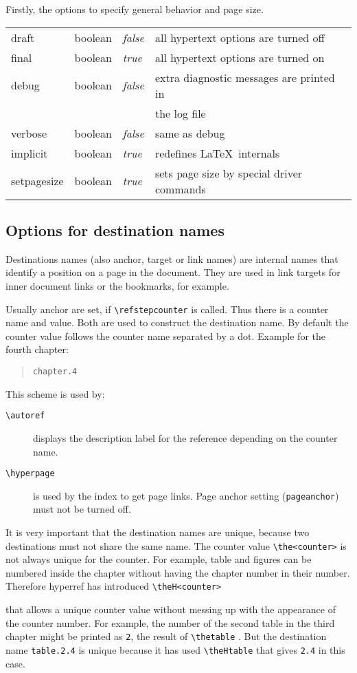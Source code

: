 \documentclass{article}
\newcommand*{\cs}[1]{%
  \texttt{\textbackslash #1}%
}
\newcommand*{\xpackage}[1]{\textsf{#1}}
\begin{document}
Firstly, the options to specify general behavior and page size.

\medskip
\begin{longtable}{>{\ttfamily}ll>{\itshape}ll}
draft          & boolean & false & all hypertext options are turned off \\
final          & boolean & true  & all hypertext options are turned on \\
debug          & boolean & false & extra diagnostic messages are printed in \\
               &         &       & the log file \\
verbose        & boolean & false & same as debug \\
implicit       & boolean & true  & redefines \LaTeX\ internals \\
setpagesize    & boolean & true  & sets page size by special driver commands
\end{longtable}

\subsection{Options for destination names}

Destinations names (also anchor, target or link names) are internal
names that identify a position on a page in the document. They
are used in link targets for inner document links or the bookmarks,
for example.

Usually anchor are set, if \cs{refstepcounter} is called.
Thus there is a counter name and value. Both are used to
construct the destination name. By default the counter value
follows the counter name separated by a dot. Example for
the fourth chapter:
\begin{quote}
  \verb|chapter.4|
\end{quote}
This scheme is used by:
\begin{description}
\item[\cs{autoref}] displays the description label for the
  reference depending on the counter name.
\item[\cs{hyperpage}] is used by the index to get
page links. Page anchor setting (\verb|pageanchor|) must not
be turned off.
\end{description}

It is very important that the destination names are unique,
because two destinations must not share the same name.
The counter value \cs{the<counter>} is not always unique
for the counter. For example, table and figures can be numbered
inside the chapter without having the chapter number in their
number. Therefore \xpackage{hyperref} has introduced \cs{theH<counter>}
that allows a unique counter value without messing up with
the appearance of the counter number. For example, the number
of the second table in the third chapter might be printed
as \texttt{2}, the result of \cs{thetable}. But the
destination name \texttt{table.2.4} is unique because it
has used \cs{theHtable} that gives \verb|2.4| in this case.
\end{document}

